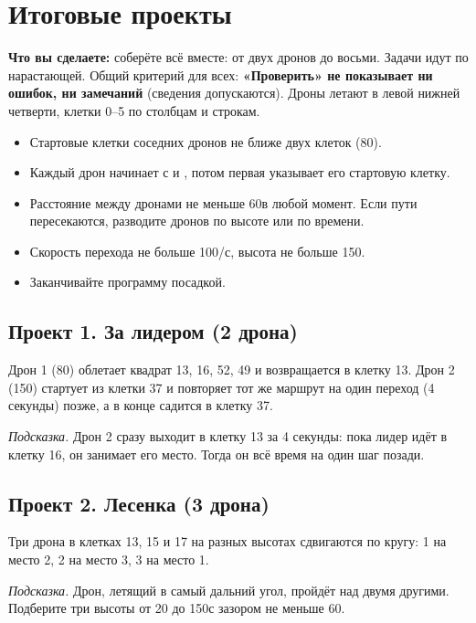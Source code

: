 \chapter{Итоговые проекты}\label{ch:proekty}

\textbf{Что вы сделаете:} соберёте всё вместе: от двух дронов до восьми. Задачи идут по нарастающей. Общий критерий для всех: \textbf{«Проверить» не показывает ни ошибок, ни замечаний} (сведения допускаются). Дроны летают в левой нижней четверти, клетки 0--5 по столбцам и строкам.

\begin{zametka}
\begin{itemize}
  \item Стартовые клетки соседних дронов не ближе двух клеток (80\cm).
  \item Каждый дрон начинает с  и , потом первая  указывает его стартовую клетку.
  \item Расстояние между дронами не меньше 60\cm в любой момент. Если пути пересекаются, разводите дронов по высоте или по времени.
  \item Скорость перехода не больше 100\cm/с, высота не больше 150\cm.
  \item Заканчивайте программу посадкой.
\end{itemize}
\end{zametka}

\section{Проект 1. За лидером (2 дрона)}

Дрон 1 (80\cm) облетает квадрат 13, 16, 52, 49 и возвращается в клетку 13. Дрон 2 (150\cm) стартует из клетки 37 и повторяет тот же маршрут на один переход (4 секунды) позже, а в конце садится в клетку 37.

\emph{Подсказка.} Дрон 2 сразу выходит в клетку 13 за 4 секунды: пока лидер идёт в клетку 16, он занимает его место. Тогда он всё время на один шаг позади.

\section{Проект 2. Лесенка (3 дрона)}

Три дрона в клетках 13, 15 и 17 на разных высотах сдвигаются по кругу: 1 на место 2, 2 на место 3, 3 на место 1.

\emph{Подсказка.} Дрон, летящий в самый дальний угол, пройдёт над двумя другими. Подберите три высоты от 20 до 150\cm с зазором не меньше 60\cm.

